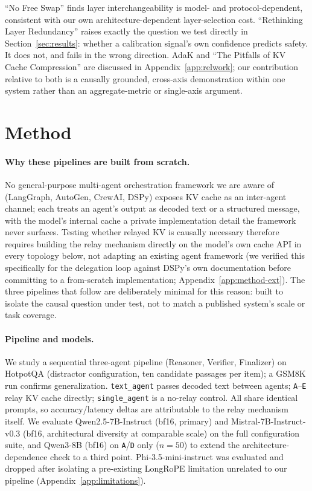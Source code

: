 \documentclass[11pt]{article}
\begin{document}
``No Free Swap'' \citep{nofreeswap2026} finds layer interchangeability
is model- and protocol-dependent, consistent with our own
architecture-dependent layer-selection cost. ``Rethinking Layer
Redundancy'' \citep{rethinkredundancy2026} raises exactly the question
we test directly in Section~\ref{sec:results}: whether a calibration
signal's own confidence predicts safety. It does not, and fails in the
wrong direction. AdaK \citep{adak2026} and ``The Pitfalls of KV Cache
Compression'' \citep{pitfallskv2026} are discussed in
Appendix~\ref{app:relwork}; our contribution relative to both is a
causally grounded, cross-axis demonstration within one system rather
than an aggregate-metric or single-axis argument.

\section{Method}
\label{sec:method}

\paragraph{Why these pipelines are built from scratch.} No
general-purpose multi-agent orchestration framework we are aware of
(LangGraph, AutoGen, CrewAI, DSPy) exposes KV cache as an inter-agent
channel; each treats an agent's output as decoded text or a structured
message, with the model's internal cache a private implementation
detail the framework never surfaces. Testing whether relayed KV is
causally necessary therefore requires building the relay mechanism
directly on the model's own cache API in every topology below, not
adapting an existing agent framework (we verified this specifically for
the delegation loop against DSPy's own documentation before committing
to a from-scratch implementation; Appendix~\ref{app:method-ext}). The
three pipelines that follow are deliberately minimal for this reason:
built to isolate the causal question under test, not to match a
published system's scale or task coverage.

\paragraph{Pipeline and models.} We study a sequential three-agent
pipeline (Reasoner, Verifier, Finalizer) on HotpotQA
\citep{hotpotqa2018} (distractor configuration, ten candidate passages
per item); a GSM8K \citep{gsm8k2021} run confirms generalization.
\texttt{text\_agent} passes decoded text between agents;
\texttt{A}--\texttt{E} relay KV cache directly; \texttt{single\_agent}
is a no-relay control. All share identical prompts, so accuracy/latency
deltas are attributable to the relay mechanism itself. We evaluate
Qwen2.5-7B-Instruct \citep{qwen2p5_2024} (bf16, primary) and
Mistral-7B-Instruct-v0.3 \citep{mistral7b2023} (bf16, architectural
diversity at comparable scale) on the full configuration suite, and
Qwen3-8B (bf16) on \texttt{A}/\texttt{D} only ($n=50$) to extend the
architecture-dependence check to a third point. Phi-3.5-mini-instruct
was evaluated and dropped after isolating a pre-existing LongRoPE
limitation unrelated to our pipeline (Appendix~\ref{app:limitations}).
\end{document}

